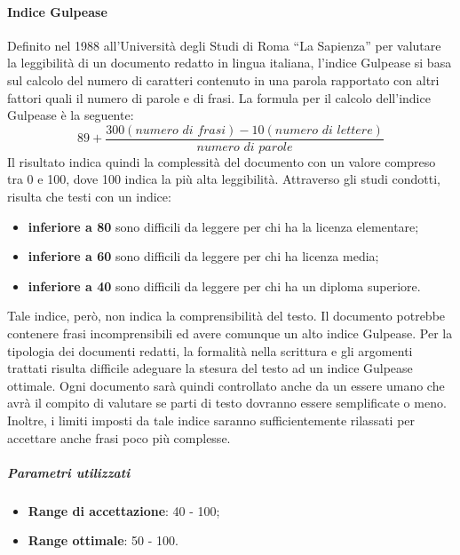 \documentclass[../PianoDiQualifica.tex]{subfiles}
\begin{document}
				\paragraph{Indice Gulpease\\}
					Definito nel 1988 all'Università degli Studi di Roma ``La
					Sapienza'' per valutare la leggibilità di un documento redatto in
					lingua italiana, l'indice Gulpease si basa sul calcolo del
					numero di caratteri contenuto in una parola rapportato con altri
					fattori quali il numero di parole e di frasi.
					La formula per il calcolo dell'indice Gulpease è la seguente:
					\begin{equation*}
						89+\frac{300\left(\textit{numero di frasi}\right)-10\left(\textit{numero di lettere}\right)}{\textit{numero di parole}}
					\end{equation*}
					Il risultato indica	quindi la complessità del documento con un
					valore compreso tra 0 e 100, dove 100 indica la più alta
					leggibilità. Attraverso gli studi condotti,	risulta che testi con
					un indice:
					\begin{itemize}
						\item \textbf{inferiore a 80} sono difficili da leggere per chi
						ha la licenza elementare;
						\item \textbf{inferiore a 60} sono difficili da leggere per chi
						ha licenza media;
						\item \textbf{inferiore a 40} sono difficili da leggere per chi
						ha un diploma superiore.
					\end{itemize}
					Tale indice, però, non indica la comprensibilità del testo. Il
					documento potrebbe contenere frasi incomprensibili ed avere comunque
					un alto indice Gulpease. Per la tipologia dei documenti redatti, la
					formalità nella scrittura e gli argomenti trattati risulta difficile
					adeguare la stesura del testo ad un indice Gulpease ottimale. Ogni
					documento sarà quindi controllato anche da un essere umano
					che avrà il compito di valutare se parti di testo dovranno essere
					semplificate o meno. Inoltre, i limiti imposti da tale indice
					saranno sufficientemente rilassati per accettare anche frasi poco
					più complesse.
					\subparagraph{Parametri utilizzati}
						\begin{itemize}
							\item \textbf{Range di accettazione}: 40 - 100;
							\item \textbf{Range ottimale}: 50 - 100.
						\end{itemize}
\end{document}
